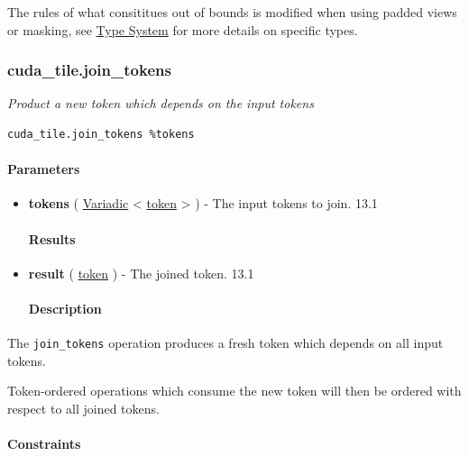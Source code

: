 \documentclass{article}
\begin{document}
The rules of what consititues out of bounds is modified when using padded views or masking, see \href{https://docs.nvidia.com/cuda/tile-ir/latest/sections/types.html#section-types}{Type System} for more details on specific types.



\subsubsection{cuda\_tile.join\_tokens}

\textit{Product a new token which depends on the input tokens}


\begin{lstlisting}
cuda_tile.join_tokens %tokens
\end{lstlisting}

\paragraph{Parameters}

\begin{itemize}
\item \textbf{tokens} ( \href{https://docs.nvidia.com/cuda/tile-ir/latest/sections/operations.html#type-variadic}{Variadic} < \href{https://docs.nvidia.com/cuda/tile-ir/latest/sections/operations.html#type-token}{token} > ) - The input tokens to join. 13.1


\paragraph{Results}

\item \textbf{result} ( \href{https://docs.nvidia.com/cuda/tile-ir/latest/sections/operations.html#type-token}{token} ) - The joined token. 13.1


\paragraph{Description}

\end{itemize}
The \texttt{join\_tokens} operation produces a fresh token which depends on all input tokens.

Token-ordered operations which consume the new token will then be ordered with respect to all joined tokens.



\paragraph{Constraints}
\end{document}
